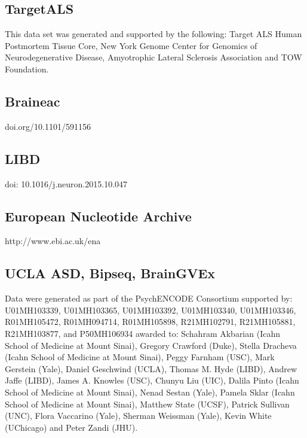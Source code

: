 \subsection{TargetALS}

This data set was generated and supported by the following: Target ALS Human Postmortem Tissue Core, New York Genome Center for Genomics of Neurodegenerative Disease, Amyotrophic Lateral Sclerosis Association and TOW Foundation. 

\subsection{Braineac}

doi.org/10.1101/591156 

\subsection{LIBD}

doi: 10.1016/j.neuron.2015.10.047 


\subsection{European Nucleotide Archive }

http://www.ebi.ac.uk/ena 

\subsection{UCLA ASD, Bipseq, BrainGVEx}

Data were generated as part of the PsychENCODE Consortium supported by: U01MH103339, U01MH103365, U01MH103392, U01MH103340, U01MH103346, R01MH105472, R01MH094714, R01MH105898, R21MH102791, R21MH105881, R21MH103877, and P50MH106934 awarded to: Schahram Akbarian (Icahn School of Medicine at Mount Sinai), Gregory Crawford (Duke), Stella Dracheva (Icahn School of Medicine at Mount Sinai), Peggy Farnham (USC), Mark Gerstein (Yale), Daniel Geschwind (UCLA), Thomas M. Hyde (LIBD), Andrew Jaffe (LIBD), James A. Knowles (USC), Chunyu Liu (UIC), Dalila Pinto (Icahn School of Medicine at Mount Sinai), Nenad Sestan (Yale), Pamela Sklar (Icahn School of Medicine at Mount Sinai), Matthew State (UCSF), Patrick Sullivan (UNC), Flora Vaccarino (Yale), Sherman Weissman (Yale), Kevin White (UChicago) and Peter Zandi (JHU). 





